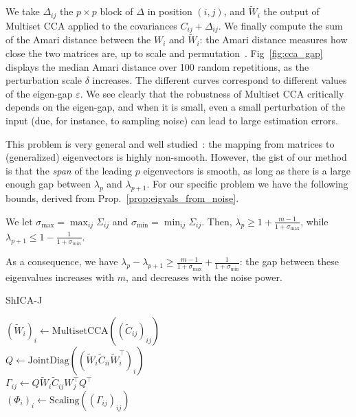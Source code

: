 %
We take $\Delta_{ij}$ the $p\times p$ block of $\Delta$ in position $(i, j)$, and $\tilde{W}_i$ the output of Multiset CCA applied to the covariances $C_{ij} + \Delta_{ij}$.
%
We finally compute the sum of the Amari distance between the $W_i$ and $\tilde{W}_i$: the Amari distance measures how close the two matrices are, up to scale and permutation~\cite{amari1996new}.
Fig~\ref{fig:cca_gap} displays the median Amari distance over 100 random repetitions, as the perturbation scale $\delta$ increases. The different curves correspond to different values of the eigen-gap $\varepsilon$. We see clearly that the robustness of Multiset CCA critically depends on the eigen-gap, and when it is small, even a small perturbation of the input (due, for instance, to sampling noise) can lead to large estimation errors.


This problem is very general and well studied~\cite{stewart1973error}: the mapping from matrices to (generalized) eigenvectors is highly non-smooth.
%
However, the gist of our method is that the \emph{span} of the leading $p$ eigenvectors is smooth, as long as there is a large enough gap between  $\lambda_p$ and $\lambda_{p+1}$.
For our specific problem we have the following bounds, derived from Prop.~\ref{prop:eigvals_from_noise}.
\begin{proposition}
  We let $\sigma_{\max} = \max_{ij}\Sigma_{ij}$ and $\sigma_{\min} = \min_{ij}\Sigma_{ij}$. Then, $\lambda_p \geq 1 + \frac{m-1}{1+\sigma_{\max}}$, while $\lambda_{p+1}\leq 1 - \frac{1}{1 + \sigma_{min}}$.
\end{proposition}
As a consequence, we have $\lambda_{p} -\lambda_{p+1} \geq \frac{m-1}{1+\sigma_{\max}} + \frac{1}{1+ \sigma_{\min}}$: the gap between these eigenvalues increases with $m$, and decreases with the noise power.

  \begin{algorithm}[H]
    \SetAlgoLined
  \caption{ShICA-J}
  \label{algo:shicaj}
    $(\tilde{W}_i)_i \leftarrow \mathrm{MultisetCCA}((\tilde{C}_{ij})_{ij})$ \\
        $Q \leftarrow
        \mathrm{JointDiag}((\tilde{W}_i\tilde{C}_{ii}\tilde{W}_i^{\top})_i)$ \\
       $\Gamma_{ij} \leftarrow Q\tilde{W}_i\tilde{C}_{ij}W_j^\top Q^\top$ \\
       $(\Phi_i)_i \leftarrow \mathrm{Scaling}((\Gamma_{ij})_{ij})$ \\
  \end{algorithm}


